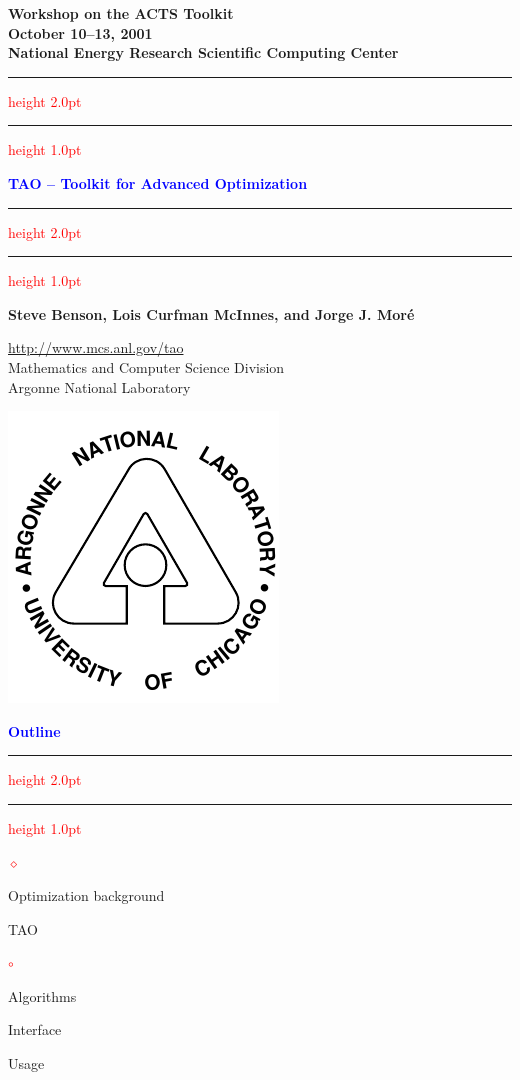 \documentclass{seminar}
\newcommand{\reddiamond}{\textcolor{red}{$\diamond$}}
\newcommand{\redcircle}{\textcolor{red}{$\circ$}}
\newcommand{\redstripe}{\textcolor{red}{\hrule height 2.0pt\hfil}
             \vspace{-1.8pt}
             \textcolor{red}{\hrule height 1.0pt\hfil}
}
\newcommand{\heading}[1]{%
   \centerline{\textcolor{blue}{\textbf{#1}}}%
    \redstripe%
    \bigskip
}
\begin{document}
\begin{slide}

\begin{center}
{\bf
Workshop on the ACTS Toolkit \\
October 10--13, 2001 \\
National Energy Research Scientific Computing Center
}
\end{center}

\redstripe

\begin{center}
{\bf
\textcolor{blue}{TAO -- Toolkit for Advanced Optimization}
}

\redstripe

\medskip

\centerline{\textbf{Steve Benson, Lois Curfman McInnes, and Jorge J. Mor\'e}}

\end{center}


\parbox[b]{3in}{\url{http://www.mcs.anl.gov/tao} \bigskip \\
\small  Mathematics and Computer Science Division \\ 
Argonne National Laboratory} \includegraphics[scale=0.5]{../images//argonne}

\end{slide}

\begin{slide}

\heading{Outline}

\begin{list}{\reddiamond}{}
\item
Optimization background
\item
TAO
\begin{list}{\redcircle}{}
\item
Algorithms
\item
Interface
\item
Usage
\end{list}
\end{list}

\vfill

\end{slide}
\end{document}
